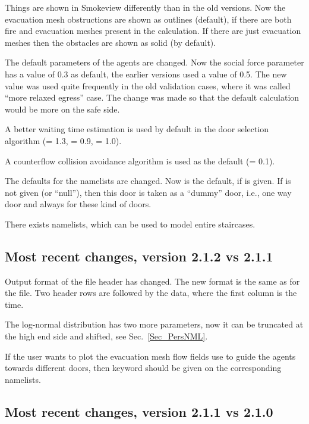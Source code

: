 \documentclass[12pt,a4paper,final,twoside]{stylevk}
\begin{document}
\noindent Things are shown in Smokeview differently than in the old
versions.  Now the evacuation mesh obstructions are shown as outlines
(default), if there are both fire and evacuation meshes present in the
calculation.  If there are just evacuation meshes then the obstacles
are shown as solid (by default).


The default parameters of the agents are changed.  Now the social
force parameter  has a value of 0.3 as default, the
earlier versions used a value of 0.5.  The new value was used quite
frequently in the old validation cases, where it was called ``more
relaxed egress'' case.  The change was made so that the default
calculation would be more on the safe side.


A better waiting time estimation is used by default in the door
selection algorithm (= 1.3,
= 0.9, = 1.0).


A counterflow collision avoidance algorithm is used as the default
(= 0.1).


The defaults for the  namelists are changed.  Now
 is the default, if  is
given.  If  is not given (or ``null''), then this door
is taken as a ``dummy'' door, i.e., one way door and
 always for these kind of doors.


There exists  namelists, which can be used to model entire
staircases.


\subsection{Most recent changes, version 2.1.2 vs
  2.1.1}\label{Sec_212vs211} 

\noindent Output format of the file  header has
changed.  The new format is the same as for the 
file.  Two header rows are followed by the data, where the first
column is the time.


The log-normal distribution has two more parameters, now it can be
truncated at the high end side and shifted, see
Sec.~\ref{Sec_PersNML}.


If the user wants to plot the evacuation mesh flow fields use to guide
the agents towards different doors, then keyword
 should be given on the corresponding
 namelists.


\subsection{Most recent changes, version 2.1.1 vs
  2.1.0}\label{Sec_211vs210} 
\end{document}
